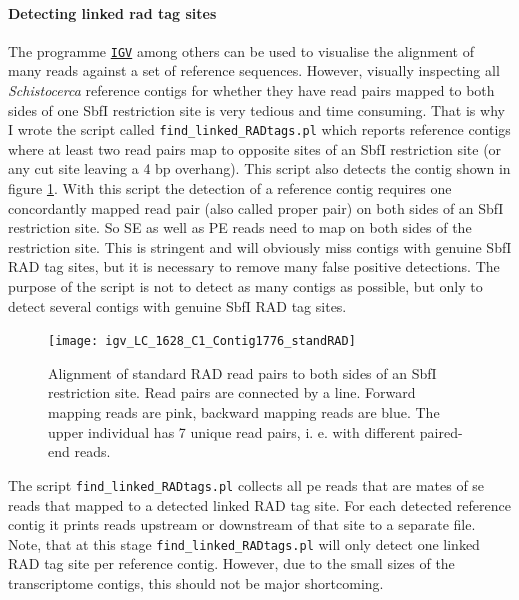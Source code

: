 \documentclass[a4paper,12pt,times,print,index,custombib,custommargin]{PhDThesisPSnPDF}\usepackage[]{graphicx}\usepackage[]{color}
\begin{document}
%
%
%

\paragraph{Detecting linked rad tag sites}\label{ch:find_linked_RADtags}
The programme \href{http://www.broadinstitute.org/software/igv/home}{\texttt{IGV}} among others can be used to visualise the alignment of many reads against a set of reference sequences. However, visually inspecting all \textit{Schistocerca} reference contigs for whether they have read pairs mapped to both sides of one SbfI restriction site is very tedious and time consuming. That is why I wrote the script called \texttt{find\_linked\_RADtags.pl} which reports reference contigs where at least two read pairs map to opposite sites of an SbfI restriction site (or any cut site leaving a 4 bp overhang). This script also detects the contig shown in figure \ref{LC.1628.C1.Contig1776_standRAD}. With this script the detection of a reference contig requires one \gls{concordant}ly mapped read pair (also called \gls{proper pair}) on both sides of an SbfI restriction site. So SE as well as PE reads need to map on both sides of the restriction site. This is stringent and will obviously miss contigs with genuine SbfI RAD tag sites, but it is necessary to remove many false positive detections. The purpose of the script is not to detect as many contigs as possible, but only to detect several contigs with genuine SbfI RAD tag sites.
%
\begin{figure}
\centering
\texttt{[image: igv\_LC\_1628\_C1\_Contig1776\_standRAD]}
\caption{Alignment of standard RAD read pairs to both sides of an SbfI restriction site. Read pairs are connected by a line. Forward mapping reads are pink, backward mapping reads are blue. The upper individual has 7 unique read pairs, i. e. with different paired-end reads.}
\label{LC.1628.C1.Contig1776_standRAD}
\end{figure}
%
The script \texttt{find\_linked\_RADtags.pl} collects all \gls{pe} reads that are mates of \gls{se} reads that mapped to a detected \gls{linked RAD tag site}. For each detected reference contig it prints reads upstream or downstream of that site to a separate file. Note, that at this stage \texttt{find\_linked\_RADtags.pl} will only detect one \gls{linked RAD tag site} per reference contig. However, due to the small sizes of the transcriptome contigs, this should not be major shortcoming.

%
%
%
\end{document}
